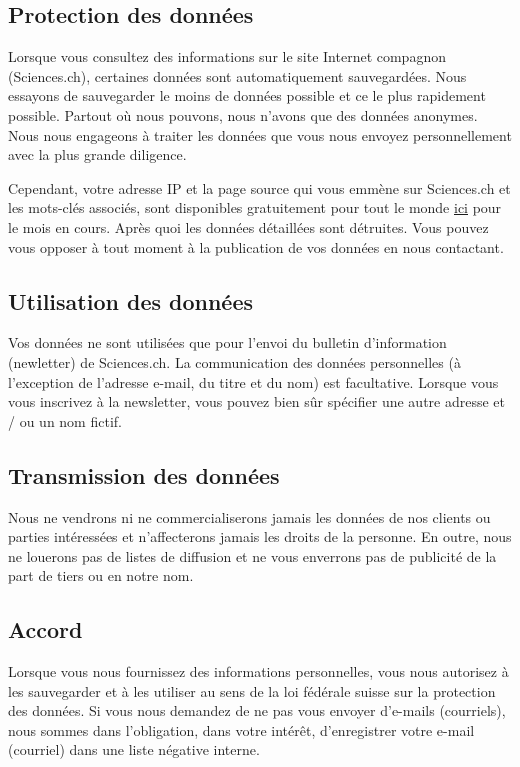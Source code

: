 	\pagebreak
	\subsection{Protection des données}
	Lorsque vous consultez des informations sur le site Internet compagnon (Sciences.ch), certaines données sont automatiquement sauvegardées. Nous essayons de sauvegarder le moins de données possible et ce le plus rapidement possible. Partout où nous pouvons, nous n'avons que des données anonymes. Nous nous engageons à traiter les données que vous nous envoyez personnellement avec la plus grande diligence.

	Cependant, votre adresse IP et la page source qui vous emmène sur Sciences.ch et les mots-clés associés, sont disponibles gratuitement pour tout le monde \href{http://www.sciences.ch/htmlfr/php/cedstat/references.php}{ici} pour le mois en cours. Après quoi les données détaillées sont détruites. Vous pouvez vous opposer à tout moment à la publication de vos données en nous contactant.

	\subsection{Utilisation des données}
	Vos données ne sont utilisées que pour l'envoi du bulletin d'information (newletter) de Sciences.ch. La communication des données personnelles (à l'exception de l'adresse e-mail, du titre et du nom) est facultative. Lorsque vous vous inscrivez à la newsletter, vous pouvez bien sûr spécifier une autre adresse et / ou un nom fictif.

	\subsection{Transmission des données}
	Nous ne vendrons ni ne commercialiserons jamais les données de nos clients ou parties intéressées et n'affecterons jamais les droits de la personne. En outre, nous ne louerons pas de listes de diffusion et ne vous enverrons pas de publicité de la part de tiers ou en notre nom.

	\subsection{Accord}
	Lorsque vous nous fournissez des informations personnelles, vous nous autorisez à les sauvegarder et à les utiliser au sens de la loi fédérale suisse sur la protection des données. Si vous nous demandez de ne pas vous envoyer d'e-mails (courriels), nous sommes dans l'obligation, dans votre intérêt, d'enregistrer votre e-mail (courriel) dans une liste négative interne.
	
